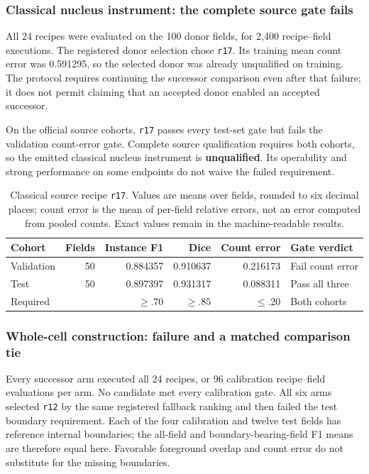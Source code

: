 \subsubsection{Classical nucleus instrument: the complete source gate fails}

All 24 recipes were evaluated on the 100 donor fields, for 2,400 recipe--field executions. The registered donor selection chose \texttt{r17}. Its training mean count error was 0.591295, so the selected donor was already unqualified on training. The protocol requires continuing the successor comparison even after that failure; it does not permit claiming that an accepted donor enabled an accepted successor.

On the official source cohorts, \texttt{r17} passes every test-set gate but fails the validation count-error gate. Complete source qualification requires both cohorts, so the emitted classical nucleus instrument is \textbf{unqualified}. Its operability and strong performance on some endpoints do not waive the failed requirement.

\begin{table}[htbp]
\centering\small
\begin{tabularx}{\linewidth}{@{}P{1.2in}rrrrY@{}}
\toprule
\textbf{Cohort} & \textbf{Fields} & \textbf{Instance F1} & \textbf{Dice} & \textbf{Count error} & \textbf{Gate verdict}\\
\midrule
Validation & 50 & 0.884357 & 0.910637 & 0.216173 & Fail count error\\
Test & 50 & 0.897397 & 0.931317 & 0.088311 & Pass all three\\
\midrule
Required & & $\geq .70$ & $\geq .85$ & $\leq .20$ & Both cohorts\\
\bottomrule
\end{tabularx}
\caption{Classical source recipe \texttt{r17}. Values are means over fields, rounded to six decimal places; count error is the mean of per-field relative errors, not an error computed from pooled counts. Exact values remain in the machine-readable results.}
\label{tab:classical-source}
\end{table}

\subsubsection{Whole-cell construction: failure and a matched comparison tie}

Every successor arm executed all 24 recipes, or 96 calibration recipe--field evaluations per arm. No candidate met every calibration gate. All six arms selected \texttt{r12} by the same registered fallback ranking and then failed the test boundary requirement. Each of the four calibration and twelve test fields has reference internal boundaries; the all-field and boundary-bearing-field F1 means are therefore equal here. Favorable foreground overlap and count error do not substitute for the missing boundaries.

